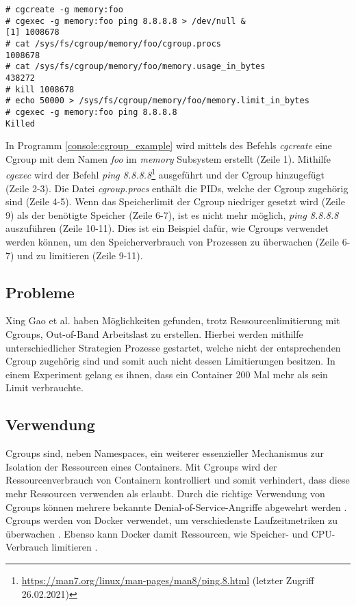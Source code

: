 \begin{lstlisting}[label={console:cgroup_example},caption={Beispiel für Control
Groups}]
# cgcreate -g memory:foo
# cgexec -g memory:foo ping 8.8.8.8 > /dev/null &
[1] 1008678
# cat /sys/fs/cgroup/memory/foo/cgroup.procs
1008678
# cat /sys/fs/cgroup/memory/foo/memory.usage_in_bytes
438272
# kill 1008678
# echo 50000 > /sys/fs/cgroup/memory/foo/memory.limit_in_bytes
# cgexec -g memory:foo ping 8.8.8.8
Killed
\end{lstlisting}

In Programm \ref{console:cgroup_example} wird mittels des Befehls
\emph{cgcreate} eine Cgroup mit dem Namen \emph{foo} im \emph{memory} Subsystem
erstellt (Zeile 1). Mithilfe \emph{cgexec} wird der Befehl \emph{ping
8.8.8.8}\footnote{\url{https://man7.org/linux/man-pages/man8/ping.8.html}
(letzter Zugriff 26.02.2021)} ausgeführt und der Cgroup hinzugefügt (Zeile
2-3). Die Datei \emph{cgroup.procs} enthält die PIDs, welche der Cgroup
zugehörig sind (Zeile 4-5). Wenn das Speicherlimit der Cgroup niedriger gesetzt
wird (Zeile 9) als der benötigte Speicher (Zeile 6-7), ist es nicht mehr
möglich, \emph{ping 8.8.8.8} auszuführen (Zeile 10-11). Dies ist ein Beispiel
dafür, wie Cgroups verwendet werden können, um den Speicherverbrauch von
Prozessen zu überwachen (Zeile 6-7) und zu limitieren (Zeile 9-11).

\subsection{Probleme}
Xing Gao et al. \cite{10.1145/3319535.3354227} haben Möglichkeiten gefunden,
trotz Ressourcenlimitierung mit Cgroups, Out-of-Band Arbeitslast zu erstellen.
Hierbei werden mithilfe unterschiedlicher Strategien Prozesse gestartet, welche
nicht der entsprechenden Cgroup zugehörig sind und somit auch nicht dessen
Limitierungen besitzen. In einem Experiment gelang es ihnen, dass ein Container
200 Mal mehr als sein Limit verbrauchte.

\subsection{Verwendung}
Cgroups sind, neben Namespaces, ein weiterer essenzieller Mechanismus zur
Isolation der Ressourcen eines Containers. Mit Cgroups wird der
Ressourcenverbrauch von Containern kontrolliert und somit verhindert, dass
diese mehr Ressourcen verwenden als erlaubt. Durch die richtige Verwendung von
Cgroups können mehrere bekannte \mbox{Denial-of-Service-Angriffe} abgewehrt
werden \cite{10.1145/3274694.3274720}. Cgroups werden von Docker verwendet, um
verschiedenste Laufzeitmetriken zu überwachen \cite{dockercgroups}. Ebenso kann
Docker damit  Ressourcen, wie Speicher- und CPU-Verbrauch limitieren
\cite{docker_resource_contraints}.

